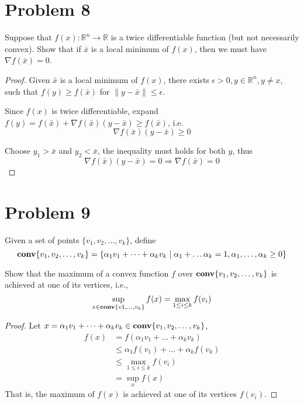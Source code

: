 \documentclass[11pt]{article}
\newcommand{\grad}{\nabla}
\newcommand{\RR}{\mathbb{R}}
\begin{document}
\clearpage
\section*{Problem 8}
Suppose that $f(x): \RR^n \rightarrow \RR$ is a twice differentiable function (but not necessarily convex). Show that if $\bar x$ is a local minimum of $f(x)$, then we must have $\grad f(\bar x) = 0$.

\begin{proof}
  Given $\bar x$ is a local minimum of $f(x)$, there exists $\epsilon>0, y\in \RR^n, y\neq x$, such that $f(y) \geq f(\bar x)$ for $\|y - \bar x\| \leq \epsilon$.

  Since $f(x)$ is twice differentiable, expand $f(y) = f(\bar x) + \grad f(\bar x) (y - \bar x) \geq f(\bar x)$, i.e. 
  $$\grad f(\bar x) (y - \bar x) \geq 0$$

  Choose $y_1>\bar x$ and $y_2 < \bar x$, the inequality must holds for both $y$, thus 
  \[
    \grad f(\bar x) (y - \bar x) = 0 \Rightarrow \grad f(\bar x) = 0
  \]
\end{proof}


\clearpage
\section*{Problem 9}
Given a set of points $\{v_1, v_2, \dots, v_k\}$, define
\[
\mathop {\textbf{conv}}\{v_1, v_2, \dots, v_k\} = \{\alpha_1 v_1 + \dots + \alpha_k v_k\mid \alpha_1 + \dots \alpha_k = 1, \alpha_1, \dots, \alpha_k \geq 0\}
\]

Show that the maximum of a convex function $f$ over $\mathop {\textbf{conv}}\{v_1, v_2, \dots, v_k\}$ is achieved at one of its vertices, i.e.,
\[
\sup_{x\in\mathop {\textbf{conv}}\{v1, \dots, v_k\}} f(x) = \max_{1\leq i \leq k} f(v_i)
\]

\begin{proof}
  Let $x = \alpha_1 v_1 + \dots + \alpha_k v_k \in \mathop {\textbf{conv}}\{v_1, v_2, \dots, v_k\}$,
  \begin{align*}
    f(x) 
    &= f(\alpha_1 v_1 + \dots + \alpha_k v_k)\\
    &\leq \alpha_1 f(v_1) + \dots + \alpha_k f(v_k)\\
    &\leq \max_{1\leq i \leq k} f(v_i)\\
    &=\sup_x f(x)
  \end{align*}
  That is, the maximum of $f(x)$ is achieved at one of its vertices $f(v_i)$.
\end{proof}
\end{document}
